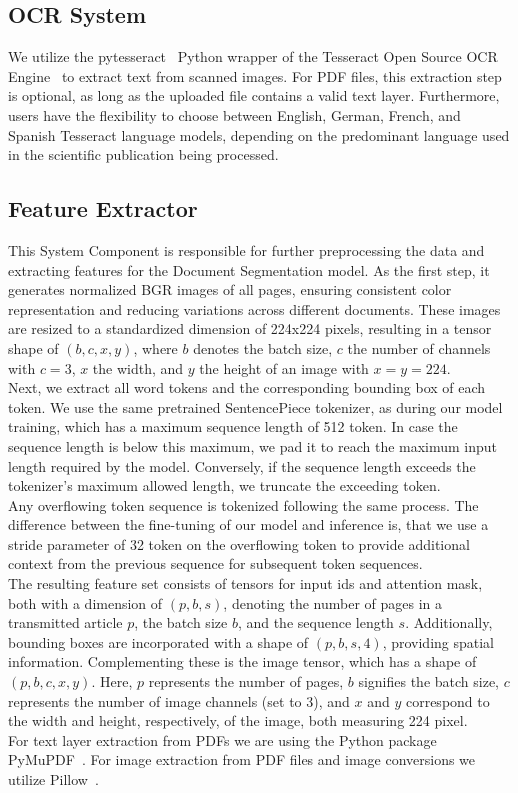 \subsection{OCR System}
We utilize the pytesseract~\cite{pytess} Python wrapper of the Tesseract Open Source OCR Engine~\cite{tesseract} to extract text from scanned images. For PDF files, this extraction step is optional, as long as the uploaded file contains a valid text layer. Furthermore, users have the flexibility to choose between English, German, French, and Spanish Tesseract language models, depending on the predominant language used in the scientific publication being processed.
\subsection{Feature Extractor}\label{sec:bibex_feature}
This System Component is responsible for further preprocessing the data and extracting features for the Document Segmentation model. As the first step, it generates normalized BGR images of all pages, ensuring consistent color representation and reducing variations across different documents. These images are resized to a standardized dimension of 224x224 pixels, resulting in a tensor shape of $(b,c,x,y)$, where $b$ denotes the batch size, $c$ the number of channels with $c=3$, $x$ the width, and $y$ the height of an image with $x=y=224$.\\
Next, we extract all word tokens and the corresponding bounding box of each token. We use the same pretrained SentencePiece tokenizer, as during our model training, which has a maximum sequence length of 512 token. In case the sequence length is below this maximum, we pad it to reach the maximum input length required by the model. Conversely, if the sequence length exceeds the tokenizer's maximum allowed length, we truncate the exceeding token.\\
Any overflowing token sequence is tokenized following the same process. The difference between the fine-tuning of our model and inference is, that we use a stride parameter of 32 token on the overflowing token to provide additional context from the previous sequence for subsequent token sequences.\\
The resulting feature set consists of tensors for input ids and attention mask, both with a dimension of $(p, b, s)$, denoting the number of pages in a transmitted article $p$, the batch size $b$, and the sequence length $s$. Additionally, bounding boxes are incorporated with a shape of $(p, b, s, 4)$, providing spatial information. Complementing these is the image tensor, which has a shape of $(p, b, c, x, y)$. Here, $p$ represents the number of pages, $b$ signifies the batch size, $c$ represents the number of image channels (set to 3), and $x$ and $y$ correspond to the width and height, respectively, of the image, both measuring 224 pixel.\\
For text layer extraction from PDFs we are using the Python package PyMuPDF~\cite{pymupdf}. For image extraction from PDF files and image conversions we utilize Pillow~\cite{clark2015pillow}.

